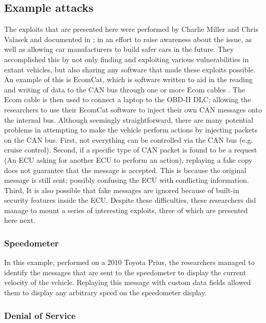 \subsection{Example attacks}
\label{subsec:example_attacks}

The exploits that are presented here were performed by Charlie Miller and Chris Valasek and documented in \cite{MillerC}; in an effort to raise awareness about the issue, as well as allowing car manufacturers to build safer cars in the future. They accomplished this by not only finding and exploiting various vulnerabilities in extant vehicles, but also sharing any software that made these exploits possible. An example of this is EcomCat, which is software written to aid in the reading and writing of data to the CAN bus through one or more Ecom cables \cite{MillerC}. The Ecom cable is then used to connect a laptop to the OBD-II DLC; allowing the researchers to use their EcomCat software to inject their own CAN messages onto the internal bus. Although seemingly straightforward, there are many potential problems in attempting to make the vehicle perform actions by injecting packets on the CAN bus. First, not everything can be controlled via the CAN bus (e.g. cruise control). Second, if a specific type of CAN packet is found to be a request (An ECU asking for another ECU to perform an action), replaying a fake copy does not guarantee that the message is accepted. This is because the original message is still sent; possibly confusing the ECU with conflicting information. Third, It is also possible that fake messages are ignored because of built-in security features inside the ECU. Despite these difficulties, these researchers did manage to mount a series of interesting exploits, three of which are presented here next.

\subsubsection{Speedometer} 
\label{subsubsec:speedometer}

In this example, performed on a 2010 Toyota Prius, the researchers managed to identify the messages that are sent to the speedometer to display the current velocity of the vehicle. Replaying this message with custom data fields allowed them to display any arbitrary speed on the speedometer display.

\subsubsection{Denial of Service} 
\label{subsubsec:denial_of_service}

